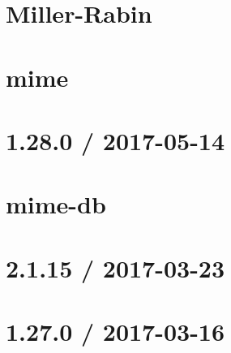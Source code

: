 \documentclass[twoside]{book}
\newcommand{\+}{\discretionary{\mbox{\scriptsize$\hookleftarrow$}}{}{}}
\begin{document}
\chapter{Miller-\/\+Rabin}
\label{md__c_1_workspace_demo_src_main_script_node_modules_miller-rabin__r_e_a_d_m_e}

\chapter{mime}
\label{md__c_1_workspace_demo_src_main_script_node_modules_mime__r_e_a_d_m_e}

\chapter{1.28.0 / 2017-\/05-\/14}
\label{md__c_1_workspace_demo_src_main_script_node_modules_mime-db__h_i_s_t_o_r_y}

\chapter{mime-\/db}
\label{md__c_1_workspace_demo_src_main_script_node_modules_mime-db__r_e_a_d_m_e}

\chapter{2.1.15 / 2017-\/03-\/23}
\label{md__c_1_workspace_demo_src_main_script_node_modules_mime-types__h_i_s_t_o_r_y}

\chapter{1.27.0 / 2017-\/03-\/16}
\label{md__c_1_workspace_demo_src_main_script_node_modules_mime-types_node_modules_mime-db__h_i_s_t_o_r_y}

\end{document}
